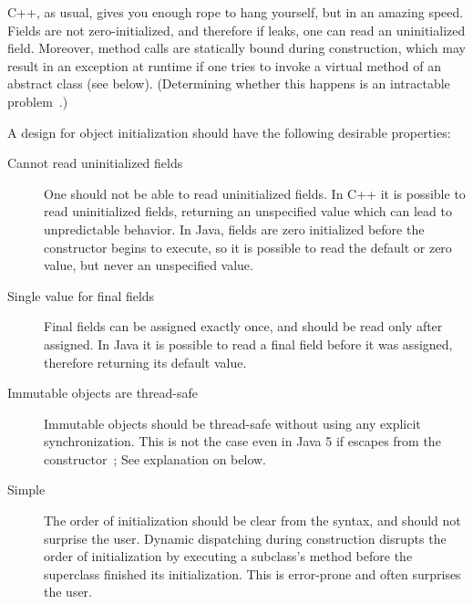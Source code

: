 \mbox{C++}, as usual, gives you enough rope to hang yourself, but in an amazing speed.
Fields are not zero-initialized, and therefore if \this leaks,
    one can read an uninitialized field.
Moreover, method calls are statically bound during construction,
    which may result in an exception at runtime
    if one tries to invoke a virtual method of an abstract class (see  below).
(Determining whether this happens is an intractable problem~\cite{Gil:1998:CTA:646155.679689}.)

A design for object initialization should have the following
    desirable properties:

\begin{description}

  \item[Cannot read uninitialized fields]
    One should not be able to read uninitialized fields.
    In \mbox{C++} it is possible to read uninitialized fields,
        returning an unspecified value which can lead to unpredictable behavior.
    In Java, fields are zero initialized before the constructor begins to execute,
        so it is possible to read the default or zero value,
        but never an unspecified value.

  \item[Single value for final fields]
    Final fields can be assigned exactly once, and
        should be read only after assigned.
    In Java it is possible to read a final field before it was assigned,
        therefore returning its default value.

  \item[Immutable objects are thread-safe]
    Immutable objects should be thread-safe without using any explicit synchronization.
    This is not the case even in Java 5 if \this escapes from the constructor~\cite{JSR133};
        See explanation on  below.


  \item[Simple]
    The order of initialization should be clear from the syntax, %
        and should not surprise the user.
    Dynamic dispatching during construction disrupts the order
        of initialization by executing a subclass's method before the superclass finished its initialization.
    This is error-prone and often surprises the user.


\end{description}
